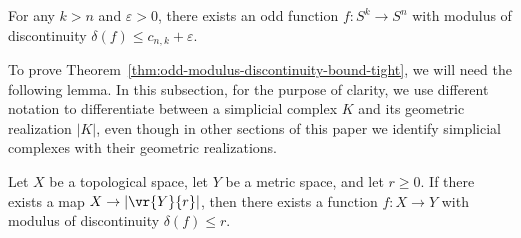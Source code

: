 \documentclass[11pt, reqno, english]{amsart}
\begin{document}

\begin{theorem}
\label{thm:odd-modulus-discontinuity-bound-tight}
For any $k>n$ and $\varepsilon>0$, there exists an odd function $f\colon S^k \to S^n$ with modulus of discontinuity $\delta(f)\le c_{n,k}+\varepsilon$.
\end{theorem}

To prove Theorem~\ref{thm:odd-modulus-discontinuity-bound-tight}, we will need the following lemma.
In this subsection, for the purpose of clarity, we use different notation to differentiate between a simplicial complex $K$ and its geometric realization $|K|$, even though in other sections of this paper we identify simplicial complexes with their geometric realizations.

\begin{lemma}
\label{lem:VR-to-mod}
Let $X$ be a topological space, let $Y$ be a metric space, and let $r\ge 0$.
If there exists a map $X\to |\vr{Y}{r}|$, then there exists a function $f\colon X\to Y$ with modulus of discontinuity $\delta(f)\le r$.
\end{lemma}
\end{document}
